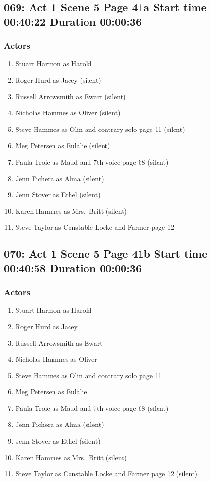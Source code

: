 \subsection{069: Act 1 Scene 5 Page 41a Start time 00:40:22 Duration 00:00:36}

\subsubsection{Actors}
\begin{enumerate}
\item Stuart Harmon as Harold
\item Roger Hurd as Jacey (silent)
\item Russell Arrowsmith as Ewart (silent)
\item Nicholas Hammes as Oliver (silent)
\item Steve Hammes as Olin and contrary solo page 11 (silent)
\item Meg Petersen as Eulalie (silent)
\item Paula Troie as Maud and 7th voice page 68 (silent)
\item Jenn Fichera as Alma (silent)
\item Jenn Stover as Ethel (silent)
\item Karen Hammes as Mrs.~Britt (silent)
\item Steve Taylor as Constable Locke and Farmer page 12
\end{enumerate}


\subsection{070: Act 1 Scene 5 Page 41b Start time 00:40:58 Duration 00:00:36}

\subsubsection{Actors}
\begin{enumerate}
\item Stuart Harmon as Harold
\item Roger Hurd as Jacey
\item Russell Arrowsmith as Ewart
\item Nicholas Hammes as Oliver
\item Steve Hammes as Olin and contrary solo page 11
\item Meg Petersen as Eulalie
\item Paula Troie as Maud and 7th voice page 68 (silent)
\item Jenn Fichera as Alma (silent)
\item Jenn Stover as Ethel (silent)
\item Karen Hammes as Mrs.~Britt (silent)
\item Steve Taylor as Constable Locke and Farmer page 12 (silent)
\end{enumerate}


